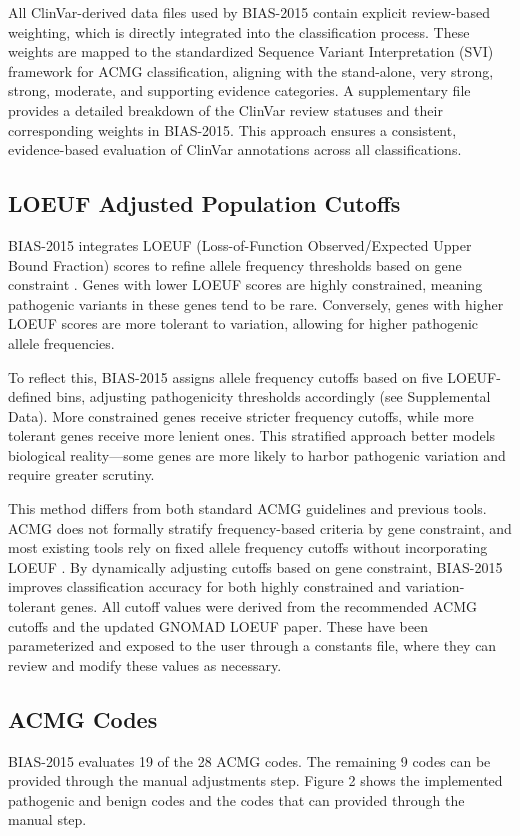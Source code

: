 \documentclass[unnumsec,webpdf,contemporary,large]{oup-authoring-template}
\theoremstyle{thmstyleone}
\theoremstyle{thmstyletwo}
\theoremstyle{thmstylethree}
\begin{document}
All ClinVar-derived data files used by BIAS-2015 contain explicit review-based weighting, which is directly integrated into the classification process. These weights are mapped to the standardized Sequence Variant Interpretation (SVI) framework for ACMG classification, aligning with the stand-alone, very strong, strong, moderate, and supporting evidence categories. A supplementary file provides a detailed breakdown of the ClinVar review statuses and their corresponding weights in BIAS-2015. This approach ensures a consistent, evidence-based evaluation of ClinVar annotations across all classifications.

\subsection{LOEUF Adjusted Population Cutoffs}
BIAS-2015 integrates LOEUF (Loss-of-Function Observed/Expected Upper Bound Fraction) scores to refine allele frequency thresholds based on gene constraint \cite{karczewski2020mutational}. Genes with lower LOEUF scores are highly constrained, meaning pathogenic variants in these genes tend to be rare. Conversely, genes with higher LOEUF scores are more tolerant to variation, allowing for higher pathogenic allele frequencies.

To reflect this, BIAS-2015 assigns allele frequency cutoffs based on five LOEUF-defined bins, adjusting pathogenicity thresholds accordingly (see Supplemental Data). More constrained genes receive stricter frequency cutoffs, while more tolerant genes receive more lenient ones. This stratified approach better models biological reality—some genes are more likely to harbor pathogenic variation and require greater scrutiny.

This method differs from both standard ACMG guidelines and previous tools. ACMG does not formally stratify frequency-based criteria by gene constraint, and most existing tools rely on fixed allele frequency cutoffs without incorporating LOEUF  \cite{richards2015standards}. By dynamically adjusting cutoffs based on gene constraint, BIAS-2015 improves classification accuracy for both highly constrained and variation-tolerant genes. All cutoff values were derived from the recommended ACMG cutoffs and the updated GNOMAD LOEUF paper.  These have been parameterized and exposed to the user through a constants file, where they can review and modify these values as necessary. 

\subsection{ACMG Codes}
BIAS-2015 evaluates 19 of the 28 ACMG codes. The remaining 9 codes can be provided through the manual adjustments step.  Figure 2 shows the implemented pathogenic and benign codes and the codes that can provided through the manual step. 
\end{document}

